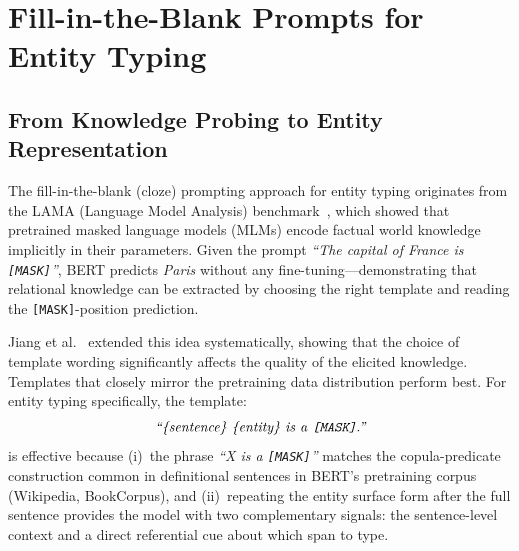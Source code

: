 \documentclass[14pt]{extreport}
\begin{document}
\section{Fill-in-the-Blank Prompts for Entity Typing}\label{sec:related_template}

\subsection{From Knowledge Probing to Entity Representation}

The fill-in-the-blank (cloze) prompting approach for entity typing originates from the LAMA (Language Model Analysis) benchmark~\cite{petroni-etal-2019-language}, which showed that pretrained masked language models (MLMs) encode factual world knowledge implicitly in their parameters. Given the prompt \textit{``The capital of France is \texttt{[MASK]}''}, BERT predicts \textit{Paris} without any fine-tuning---demonstrating that relational knowledge can be extracted by choosing the right template and reading the \texttt{[MASK]}-position prediction.

Jiang et al.~\cite{jiang-etal-2020-know} extended this idea systematically, showing that the choice of template wording significantly affects the quality of the elicited knowledge. Templates that closely mirror the pretraining data distribution perform best. For entity typing specifically, the template:
\begin{equation*}
    \textit{``\{sentence\} \{entity\} is a \texttt{[MASK]}.''}
\end{equation*}
is effective because (i)~the phrase \textit{``X is a \texttt{[MASK]}''} matches the copula-predicate construction common in definitional sentences in BERT’s pretraining corpus (Wikipedia, BookCorpus), and (ii)~repeating the entity surface form after the full sentence provides the model with two complementary signals: the sentence-level context and a direct referential cue about which span to type.
\end{document}
